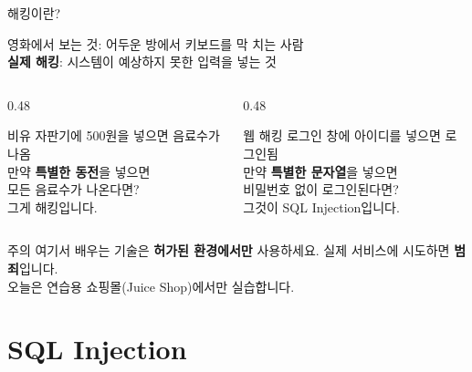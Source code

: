 \documentclass[aspectratio=169,10pt]{beamer}
\newcommand{\hlt}[1]{\textcolor{accent}{\textbf{#1}}}
\begin{document}
\begin{frame}{해킹이란?}

\begin{center}
\Large
영화에서 보는 것: 어두운 방에서 키보드를 막 치는 사람\\[0.5em]
\hlt{실제 해킹}: 시스템이 예상하지 못한 입력을 넣는 것
\end{center}

\vspace{1em}
\begin{columns}[T]
\begin{column}{0.48\textwidth}
\begin{block}{비유}
자판기에 500원을 넣으면 음료수가 나옴\\[0.3em]
만약 \hlt{특별한 동전}을 넣으면\\모든 음료수가 나온다면?\\[0.3em]
그게 해킹입니다.
\end{block}
\end{column}
\begin{column}{0.48\textwidth}
\begin{block}{웹 해킹}
로그인 창에 아이디를 넣으면 로그인됨\\[0.3em]
만약 \hlt{특별한 문자열}을 넣으면\\비밀번호 없이 로그인된다면?\\[0.3em]
그것이 SQL Injection입니다.
\end{block}
\end{column}
\end{columns}

\vspace{0.5em}
\begin{alertblock}{주의}
여기서 배우는 기술은 \hlt{허가된 환경에서만} 사용하세요. 실제 서비스에 시도하면 \hlt{범죄}입니다.\\
오늘은 연습용 쇼핑몰(Juice Shop)에서만 실습합니다.
\end{alertblock}
\end{frame}

\section{SQL Injection}
\end{document}
